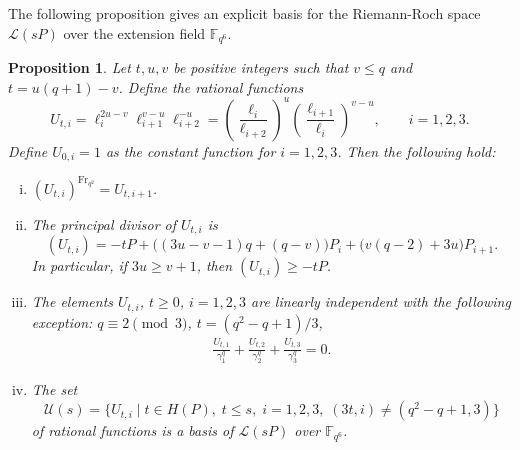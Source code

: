 \documentclass[11pt]{amsart}
\theoremstyle{plain}
\newtheorem{proposition}[theorem]{Proposition}
\theoremstyle{definition}
\theoremstyle{remark}
\newcommand{\Frob}{{\mathrm{Fr}_{q^2}}}
\begin{document}
The following proposition gives an explicit basis for the Riemann-Roch space $\mathscr{L}(sP)$ over the extension field $\mathbb{F}_{q^6}$.
\begin{proposition} \label{pr:Uti-props}
Let $t,u,v$ be positive integers such that $v\leq q$ and $t=u(q+1)-v$. Define the rational functions
\[U_{t,i} = \ell_i^{2u-v}\ell_{i+1}^{v-u}\ell_{i+2}^{-u} = \left(\frac{\ell_i}{\ell_{i+2}}\right)^u\left(\frac{\ell_{i+1}}{\ell_i}\right)^{v-u}, \qquad i=1,2,3.\]
Define $U_{0,i}=1$ as the constant function for $i=1,2,3$. Then the following hold:
\begin{enumerate}[(i)]
\item $(U_{t,i})^\Frob = U_{t,i+1}$. 
\item The principal divisor of $U_{t,i}$ is 
\[(U_{t,i}) = -tP + \big((3u-v-1)q+(q-v)\big) P_i + \big(v(q-2)+3u\big) P_{i+1}.\]
In particular, if $3u\geq v+1$, then $(U_{t,i}) \geq -tP$. 
\item The elements $U_{t,i}$, $t\geq 0$, $i=1,2,3$ are linearly independent with the following exception: $q\equiv 2 \pmod{3}$, $t=(q^2-q+1)/3$, 
\begin{align} \label{eq:U-lin-dep}
\frac{U_{t,1}}{\gamma_{1}^q} + \frac{U_{t,2}}{\gamma_{2}^q} + \frac{U_{t,3}}{\gamma_{3}^q} =0.
\end{align}
\item The set
\[\mathcal{U}(s) = \{U_{t,i} \mid t\in H(P), \; t\leq s, \; i=1,2,3, \; (3t,i) \neq (q^2-q+1,3)\}\]
of rational functions is a basis of $\mathscr{L}(sP)$ over $\mathbb{F}_{q^6}$. 
\end{enumerate}
\end{proposition}
\end{document}
